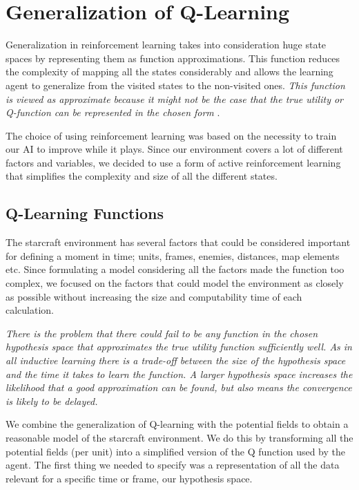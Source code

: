 \section{Generalization of Q-Learning}	\label{qlearning}

Generalization in reinforcement learning takes into consideration huge state spaces by representing them as function approximations. This function reduces the complexity of mapping all the states considerably and allows the learning agent to generalize from the visited states to the non-visited ones. \textit{This function is viewed as approximate because it might not be the case that the true utility or Q-function can be represented in the chosen form} \cite[p777]{rl}. 

The choice of using reinforcement learning was based on the necessity to train our AI to improve while it plays. Since our environment covers a lot of different factors and variables, we decided to use a form of active reinforcement learning that simplifies the complexity and size of all the different states. 

\subsection{Q-Learning Functions}

The starcraft environment has several factors that could be considered important for defining a moment in time; units, frames, enemies, distances, map elements etc. Since formulating a model considering all the factors made the function too complex, we focused on the factors that could model the environment as closely as possible without increasing the size and computability time of each calculation. 

\textit{There is the problem that there could fail to be any function in the chosen hypothesis space that approximates the true utility function sufficiently well. As in all inductive learning there is a trade-off between the size of the hypothesis space and the time it takes to learn the function. A larger hypothesis space increases the likelihood that a good approximation can be found, but also means the convergence is likely to be delayed.}\cite[p778]{rl}

We combine the generalization of Q-learning with the potential fields to obtain a reasonable model of the starcraft environment. We do this by transforming all the potential fields (per unit) into a simplified version of the Q function used by the agent. The first thing we needed to specify was a representation of all the data relevant for a specific time or frame, our hypothesis space. 

